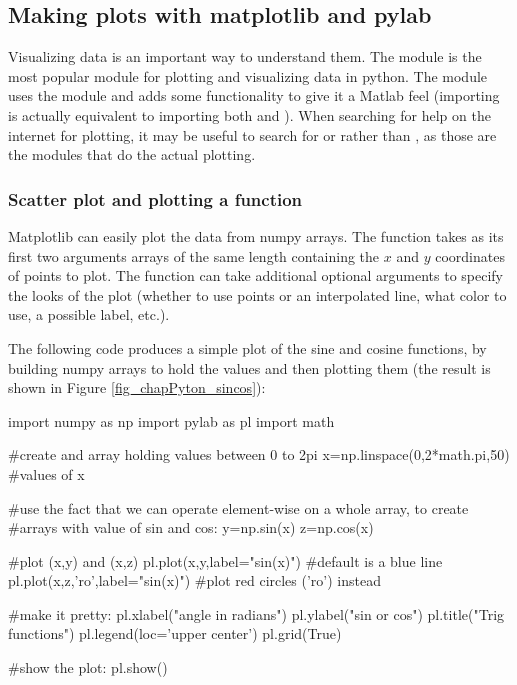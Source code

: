 \subsection{Making plots with matplotlib and pylab}
Visualizing data is an important way to understand them. The  module is the most popular module for plotting and visualizing data in python. The  module uses the  module and adds some functionality to give it a Matlab feel (importing  is actually equivalent to importing both  and ). When searching for help on the internet for plotting, it may be useful to search for  or  rather than , as those are the modules that do the actual plotting.

\subsubsection{Scatter plot and plotting a function}
Matplotlib can easily plot the data from numpy arrays. The  function takes as its first two arguments arrays of the same length containing the $x$ and $y$ coordinates of points to plot. The function can take additional optional arguments to specify the looks of the plot (whether to use points or an interpolated line, what color to use, a possible label, etc.).

The following code produces a simple plot of the sine and cosine functions, by building numpy arrays to hold the values and then plotting them (the result is shown in Figure \ref{fig_chapPyton_sincos}):

\begin{python}[caption = \mbox{}]
import numpy as np
import pylab as pl
import math 

#create  and array holding values between 0 to 2pi
x=np.linspace(0,2*math.pi,50) #values of x

#use the fact that we can operate element-wise on a whole array, to create
#arrays with value of sin and cos:
y=np.sin(x)
z=np.cos(x)

#plot (x,y) and (x,z)
pl.plot(x,y,label="sin(x)") #default is a blue line
pl.plot(x,z,'ro',label="sin(x)") #plot red circles ('ro') instead

#make it pretty:
pl.xlabel("angle in radians")
pl.ylabel("sin or cos")
pl.title("Trig functions")
pl.legend(loc='upper center')
pl.grid(True)

#show the plot:
pl.show()

\end{python} 

